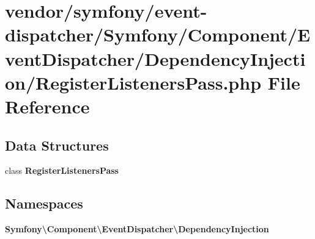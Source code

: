 \section{vendor/symfony/event-\/dispatcher/\+Symfony/\+Component/\+Event\+Dispatcher/\+Dependency\+Injection/\+Register\+Listeners\+Pass.php File Reference}
\label{event-dispatcher_2_symfony_2_component_2_event_dispatcher_2_dependency_injection_2_register_listeners_pass_8php}
\subsection*{Data Structures}
\begin{DoxyCompactItemize}
\item 
class {\bf Register\+Listeners\+Pass}
\end{DoxyCompactItemize}
\subsection*{Namespaces}
\begin{DoxyCompactItemize}
\item 
 {\bf Symfony\textbackslash{}\+Component\textbackslash{}\+Event\+Dispatcher\textbackslash{}\+Dependency\+Injection}
\end{DoxyCompactItemize}
